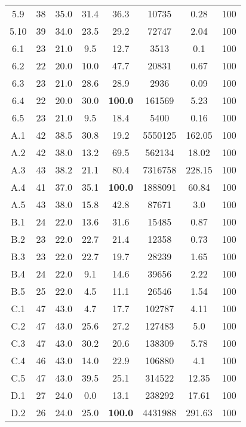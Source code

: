 \begin{longtable}{@{\extracolsep{5pt}}cccccccc}
	5.9 &
		38 & 35.0 &
			31.4
		&
			36.3
		& 10735 & 0.28 & 100
	\\
	5.10 &
		39 & 34.0 &
			23.5
		&
			29.2
		& 72747 & 2.04 & 100
	\\
	6.1 &
		23 & 21.0 &
			9.5
		&
			12.7
		& 3513 & 0.1 & 100
	\\
	6.2 &
		22 & 20.0 &
			10.0
		&
			47.7
		& 20831 & 0.67 & 100
	\\
	6.3 &
		23 & 21.0 &
			28.6
		&
			28.9
		& 2936 & 0.09 & 100
	\\
	6.4 &
		22 & 20.0 &
			30.0
		&
			\textbf{100.0}
		& 161569 & 5.23 & 100
	\\
	6.5 &
		23 & 21.0 &
			9.5
		&
			18.4
		& 5400 & 0.16 & 100
	\\
	A.1 &
		42 & 38.5 &
			30.8
		&
			19.2
		& 5550125 & 162.05 & 100
	\\
	A.2 &
		42 & 38.0 &
			13.2
		&
			69.5
		& 562134 & 18.02 & 100
	\\
	A.3 &
		43 & 38.2 &
			21.1
		&
			80.4
		& 7316758 & 228.15 & 100
	\\
	A.4 &
		41 & 37.0 &
			35.1
		&
			\textbf{100.0}
		& 1888091 & 60.84 & 100
	\\
	A.5 &
		43 & 38.0 &
			15.8
		&
			42.8
		& 87671 & 3.0 & 100
	\\
	B.1 &
		24 & 22.0 &
			13.6
		&
			31.6
		& 15485 & 0.87 & 100
	\\
	B.2 &
		23 & 22.0 &
			22.7
		&
			21.4
		& 12358 & 0.73 & 100
	\\
	B.3 &
		23 & 22.0 &
			22.7
		&
			19.7
		& 28239 & 1.65 & 100
	\\
	B.4 &
		24 & 22.0 &
			9.1
		&
			14.6
		& 39656 & 2.22 & 100
	\\
	B.5 &
		25 & 22.0 &
			4.5
		&
			11.1
		& 26546 & 1.54 & 100
	\\
	C.1 &
		47 & 43.0 &
			4.7
		&
			17.7
		& 102787 & 4.11 & 100
	\\
	C.2 &
		47 & 43.0 &
			25.6
		&
			27.2
		& 127483 & 5.0 & 100
	\\
	C.3 &
		47 & 43.0 &
			30.2
		&
			20.6
		& 138309 & 5.78 & 100
	\\
	C.4 &
		46 & 43.0 &
			14.0
		&
			22.9
		& 106880 & 4.1 & 100
	\\
	C.5 &
		47 & 43.0 &
			39.5
		&
			25.1
		& 314522 & 12.35 & 100
	\\
	D.1 &
		27 & 24.0 &
			0.0
		&
			13.1
		& 238292 & 17.61 & 100
	\\
	D.2 &
		26 & 24.0 &
			25.0
		&
			\textbf{100.0}
		& 4431988 & 291.63 & 100
	\\

\end{longtable}
